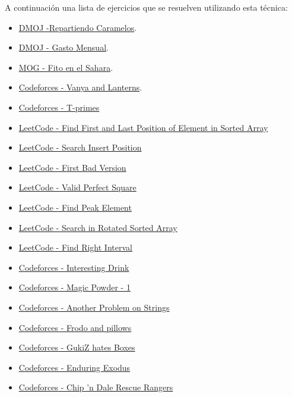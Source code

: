 A continuación una lista de ejercicios que se resuelven utilizando esta técnica:

\begin{itemize}
	\item \href{https://dmoj.uclv.edu.cu/problem/caramelos} {DMOJ -Repartiendo Caramelos}. 
    \item \href{https://dmoj.uclv.edu.cu/problem/expense} {DMOJ - Gasto Mensual}.
    \item \href{https://matcomgrader.com/problem/63/fito-en-el-sahara/} {MOG - Fito en el Sahara}.
    \item \href{https://codeforces.com/problemset/problem/492/B} {Codeforces - Vanya and Lanterns}.
    \item \href{https://codeforces.com/problemset/problem/230/B}{Codeforces - T-primes}
    \item \href{https://leetcode.com/problems/find-first-and-last-position-of-element-in-sorted-array/}{LeetCode - Find First and Last Position of Element in Sorted Array}
    \item \href{https://leetcode.com/problems/search-insert-position/}{LeetCode - Search Insert Position}
    \item \href{https://leetcode.com/problems/first-bad-version/}{LeetCode - First Bad Version}
    \item \href{https://leetcode.com/problems/valid-perfect-square/}{LeetCode - Valid Perfect Square}
    \item \href{https://leetcode.com/problems/find-peak-element/}{LeetCode - Find Peak Element}
    \item \href{https://leetcode.com/problems/search-in-rotated-sorted-array/}{LeetCode - Search in Rotated Sorted Array}
    \item \href{https://leetcode.com/problems/find-right-interval/}{LeetCode - Find Right Interval}
    \item \href{https://codeforces.com/problemset/problem/706/B/}{Codeforces - Interesting Drink}
    \item \href{https://codeforces.com/problemset/problem/670/D1}{Codeforces - Magic Powder - 1}
    \item \href{https://codeforces.com/problemset/problem/165/C}{Codeforces - Another Problem on Strings}
    \item \href{https://codeforces.com/problemset/problem/760/B}{Codeforces - Frodo and pillows}
    \item \href{https://codeforces.com/problemset/problem/551/C}{Codeforces - GukiZ hates Boxes}
    \item \href{https://codeforces.com/problemset/problem/645/C}{Codeforces - Enduring Exodus}
    \item \href{https://codeforces.com/problemset/problem/590/B}{Codeforces - Chip 'n Dale Rescue Rangers}
\end{itemize}